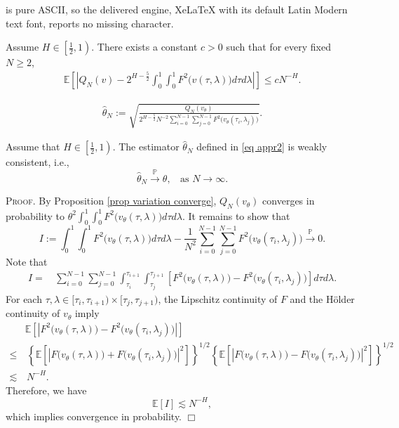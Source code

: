 \documentclass[10pt,a4paper]{amsart}
\newenvironment{proof}{\hspace{0ex}\textsc{Proof}.\hspace{1ex}}{\hfill$\Box$\newline}
\begin{document}
is pure ASCII, so the delivered engine, XeLaTeX with its default Latin Modern text font, reports no missing character.
    \begin{proposition}\label{prop variation converge}  
  Assume $H\in \left[\frac12, 1\right)$. There exists a constant $c>0$ such that  for every  fixed   $N\ge 2$, 
  \begin{align}\label{eq quad}
  \mathbb E\left[\left| Q_{N}(v)-  2^{H-\frac{5}{2}} \int_0^1\int_0^1 F^2\big(v(\tau, \lambda) \big) d\tau d\lambda \right|  \right]\le c N^{- H}.
  \end{align} 
   \end{proposition}

      \begin{align}\label{eq appr2}
    \hat \theta_N := \sqrt{\frac{Q_{N}(v_{\theta})}{ 2^{H-\frac{5}{2}} N^{-2} \sum_{i=0}^{N-1} \sum_{j=0}^{N-1} F^2\big(v_{\theta}(\tau_i, \lambda_j) \big)}}.
    \end{align}

  \begin{corollary}\label{coro est}  Assume that $H\in \left[\frac12, 1\right)$. 
 The estimator $  \hat \theta_N$ defined in  \eqref{eq appr2} is weakly consistent, i.e., 
$$ \hat \theta_N \stackrel{\mathbb P}{\longrightarrow}   \theta,  \ \ \ \ \text{as } N\rightarrow\infty.
 $$
\end{corollary}

      \begin{proof}
By Proposition  \ref{prop variation converge},  $Q_{N}(v_{\theta})$ converges in probability to  $ \theta^2 \int_0^1\int_0^1 F^2\big(v_{\theta}(\tau, \lambda)\big)d\tau d\lambda$. It remains to show that 
$$
I:=    \int_0^1\int_0^1 F^2\big(v_{\theta}(\tau, \lambda)\big)d\tau d\lambda  -\frac{1}{N^2} \sum_{i=0}^{N-1} \sum_{j=0}^{N-1} F^2\big(v_{\theta}(\tau_i, \lambda_j) \big) \stackrel{\mathbb P}{\longrightarrow} 0.
 $$
Note that 
   \begin{align*}
I= & \,   \sum_{i=0}^{N-1} \sum_{j=0}^{N-1}   \int_{\tau_i}^{\tau_{i+1}}\int_{\tau_j}^{\tau_{j+1}} \left[ F^2\big(v_{\theta}(\tau, \lambda)\big)-F^2\big(v_{\theta}(\tau_i, \lambda_j) \big)\right]d\tau d\lambda.
 \end{align*}
 For each $\tau, \lambda\in  [\tau_i, \tau_{i+1}) \times [\tau_j, \tau_{j+1})$, the   Lipschitz continuity of $F$ and the H\"older continuity of $v_{\theta}$ imply   
  \begin{align*}
& \mathbb E\left[    \left|F^2\big(v_{\theta}(\tau, \lambda)\big)-F^2\big(v_{\theta}(\tau_i, \lambda_j) \big)\right|  \right]\\
\le &\,       \left\{ \mathbb E\left[ \left|F\big(v_{\theta}(\tau, \lambda)\big)+F\big(v_{\theta}(\tau_i, \lambda_j) \big)\right|^2 \right]\right\}^{1/2}  \left\{ \mathbb E\left[ \left|F\big(v_{\theta}(\tau, \lambda)\big)-F\big(v_{\theta}(\tau_i, \lambda_j) \big)\right|^2\right]\right\}^{1/2}     \\
   \lesssim &\,   N^{-H}. 
 \end{align*}
Therefore,  we have
$$
\mathbb E\left[I \right] \lesssim N^{-H},
$$
which implies convergence in probability.  
\end{proof}
\end{document}
